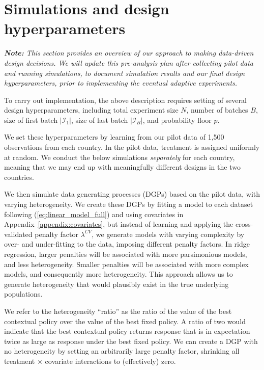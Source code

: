 \documentclass[letterpaper, 12pt, parskip=full,]{scrartcl}
\begin{document}
\section{Simulations and design hyperparameters}\label{simulations}

\textit{\textbf{Note:} This section provides an overview of our approach to making data-driven design decisions. We will update this pre-analysis plan \textit{after} collecting pilot data and running simulations, to document simulation results and our final design hyperparameters, prior to implementing the eventual adaptive experiments. }

To carry out implementation, the above description requires setting of several design hyperparameters, including total experiment size $N$, number of batches $B$,  size of first batch $|\mathcal{I}_1|$, size of last batch $|\mathcal{I}_B|$, and probability floor $p$. 

We set these hyperparameters by learning from our pilot data of 1,500 observations from each country. In the pilot data, treatment is assigned uniformly at random. We conduct the below simulations \textit{separately} for each country, meaning that we may end up with meaningfully different designs in the two countries. 

We then simulate data generating processes (DGPs) based on the pilot data, with varying heterogeneity. We create these DGPs by fitting a model to each dataset following (\ref{eq:linear_model_full}) and using covariates in Appendix~\ref{appendix:covariates}, but instead of learning and applying the cross-validated penalty factor $\lambda^{CV}$, we generate models with varying complexity by over- and under-fitting to the data, imposing different penalty factors. In ridge regression, larger penalties will be associated with more parsimonious models, and less heterogeneity. Smaller penalties will be associated with more complex models, and consequently more heterogeneity. This approach allows us to generate heterogeneity that would plausibly exist in the true underlying populations. 

We refer to the heterogeneity ``ratio'' as the ratio of the value of the best contextual policy over the value of the best fixed policy. A ratio of two would indicate that the best contextual policy returns response that is in expectation twice as large as response under the best fixed policy. We can create a DGP with no heterogeneity by setting an arbitrarily large penalty factor, shrinking all treatment $\times$ covariate interactions to (effectively) zero. 
\end{document}
